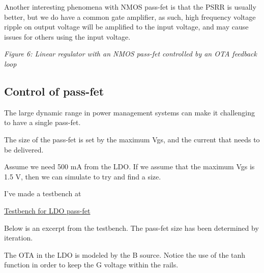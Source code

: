 Another interesting phenomena with NMOS pass-fet is that the PSRR is
usually better, but we do have a common gate amplifier, as such, high
frequency voltage ripple on output voltage will be amplified to the
input voltage, and may cause issues for others using the input voltage.


{
\centering
{}
}

\emph{Figure 6: Linear regulator with an NMOS pass-fet controlled by an
OTA feedback loop}

\subsection{Control of pass-fet}\label{control-of-pass-fet}

The large dynamic range in power management systems can make it
challenging to have a single pass-fet.

The size of the pass-fet is set by the maximum Vgs, and the current that
needs to be delivered.

Assume we need 500 mA from the LDO. If we assume that the maximum Vgs is
1.5 V, then we can simulate to try and find a size.

I've made a testbench at

\href{https://github.com/wulffern/cnr_atr_sky130nm/blob/main/sim/LDO_PFET/loadreg.spi}{Testbench
for LDO pass-fet}

Below is an excerpt from the testbench. The pass-fet size has been
determined by iteration.

The OTA in the LDO is modeled by the B source. Notice the use of the
tanh function in order to keep the G voltage within the rails.

\begin{Shaded}
\begin{Highlighting}[]
\ExtensionTok{*}
\ExtensionTok{+}

\ExtensionTok{*}

\ExtensionTok{*}
\ErrorTok{(}\ErrorTok{(}\ErrorTok{(}\ErrorTok{(}\KeywordTok{)} \ErrorTok{(}\KeywordTok{)} \KeywordTok{)))}

\ExtensionTok{*}

\ExtensionTok{*}
\end{Highlighting}
\end{Shaded}

